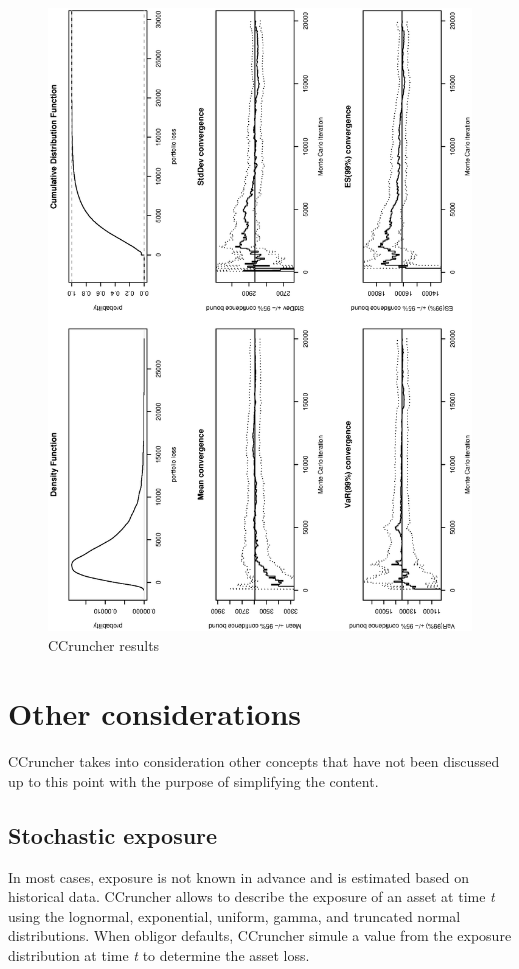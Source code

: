 \documentclass[a4paper,12pt,final]{article}
\begin{document}
\begin{figure}[p]
\begin{center}
\includegraphics[width=12cm,angle=0]{./images/report.eps}
\caption{CCruncher results}
\label{report}
\end{center}
\end{figure}


\clearpage
\section{Other considerations}
CCruncher takes into consideration other concepts that have not been discussed 
up to this point with the purpose of simplifying the content.

\subsection{Stochastic exposure}
In most cases, exposure is not known in advance and is estimated based on historical data. 
CCruncher allows to describe the exposure of an asset at time \emph{t} using the lognormal,
exponential, uniform, gamma, and truncated normal distributions. When obligor defaults, 
CCruncher simule a value from the exposure distribution at time \emph{t} 
to determine the asset loss.
\end{document}
